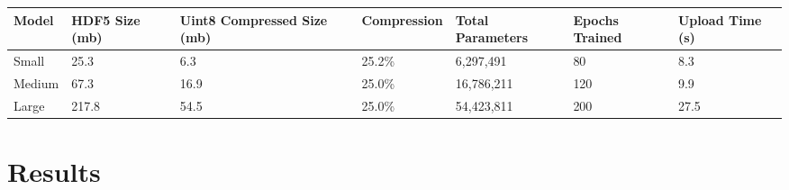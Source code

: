 \documentclass{article}
\begin{document}
\begin{small}
	\begin{center}
		\begin{tabularx}{\textwidth}{bbbbbbb}
			\toprule
			Model  & HDF5 Size (mb) & Uint8 Compressed Size (mb) & Compression & Total Parameters & Epochs Trained & Upload Time (s) \\
			\midrule
			Small  & 25.3           & 6.3                        & 25.2\%      & 6,297,491        & 80             & 8.3             \\
			Medium & 67.3           & 16.9                       & 25.0\%      & 16,786,211       & 120            & 9.9             \\
			Large  & 217.8          & 54.5                       & 25.0\%      & 54,423,811       & 200            & 27.5            \\
			\bottomrule
		\end{tabularx}
		\label{table:model_details}
	\end{center}
\end{small}

\section{Results\label{section:results}}
\end{document}
